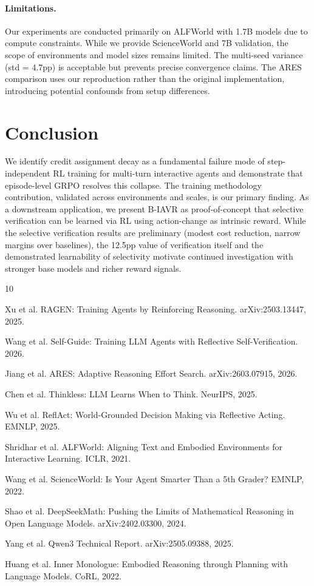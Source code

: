 \documentclass{article}
\begin{document}
\paragraph{Limitations.}
Our experiments are conducted primarily on ALFWorld with 1.7B models due to compute constraints. While we provide ScienceWorld and 7B validation, the scope of environments and model sizes remains limited. The multi-seed variance (std = 4.7pp) is acceptable but prevents precise convergence claims. The ARES comparison uses our reproduction rather than the original implementation, introducing potential confounds from setup differences.

\section{Conclusion}

We identify credit assignment decay as a fundamental failure mode of step-independent RL training for multi-turn interactive agents and demonstrate that episode-level GRPO resolves this collapse. The training methodology contribution, validated across environments and scales, is our primary finding. As a downstream application, we present B-IAVR as proof-of-concept that selective verification can be learned via RL using action-change as intrinsic reward. While the selective verification results are preliminary (modest cost reduction, narrow margins over baselines), the 12.5pp value of verification itself and the demonstrated learnability of selectivity motivate continued investigation with stronger base models and richer reward signals.


\begin{thebibliography}{10}

 Xu et al. RAGEN: Training Agents by Reinforcing Reasoning. arXiv:2503.13447, 2025.

 Wang et al. Self-Guide: Training LLM Agents with Reflective Self-Verification. 2026.

 Jiang et al. ARES: Adaptive Reasoning Effort Search. arXiv:2603.07915, 2026.

 Chen et al. Thinkless: LLM Learns When to Think. NeurIPS, 2025.

 Wu et al. ReflAct: World-Grounded Decision Making via Reflective Acting. EMNLP, 2025.

 Shridhar et al. ALFWorld: Aligning Text and Embodied Environments for Interactive Learning. ICLR, 2021.

 Wang et al. ScienceWorld: Is Your Agent Smarter Than a 5th Grader? EMNLP, 2022.

 Shao et al. DeepSeekMath: Pushing the Limits of Mathematical Reasoning in Open Language Models. arXiv:2402.03300, 2024.

 Yang et al. Qwen3 Technical Report. arXiv:2505.09388, 2025.

 Huang et al. Inner Monologue: Embodied Reasoning through Planning with Language Models. CoRL, 2022.

\end{thebibliography}
\end{document}

